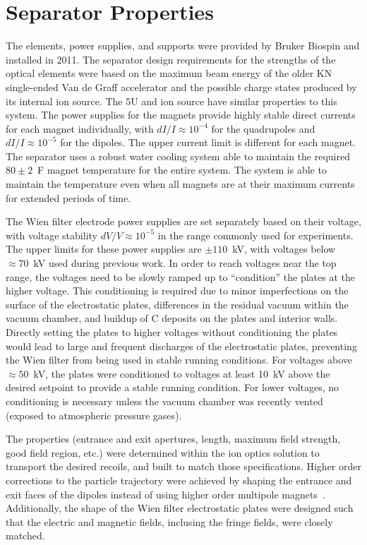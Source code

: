 \section{Separator Properties}

The elements, power supplies, and supports were provided by Bruker
Biospin and installed in 2011. The separator design requirements for the
strengths of the optical elements were based on the maximum beam energy
of the older KN single-ended Van de Graff accelerator and the possible
charge states produced by its internal ion source. The 5U and ion source
have similar properties to this system. The power supplies for the
magnets provide highly stable direct currents for each magnet
individually, with $dI/I \approx 10^{-4}$ for the quadrupoles and $dI/I
\approx 10^{-5}$ for the dipoles. The upper current limit is different
for each magnet. The separator uses a robust water cooling system able
to maintain the required $80\pm2$~\degree{}F magnet temperature for the
entire system. The system is able to maintain the temperature even when
all magnets are at their maximum currents for extended periods of time.

The Wien filter electrode power supplies are set separately based on
their voltage, with voltage stability $dV/V \approx 10^{-5}$ in the
range commonly used for experiments. The upper limits for these power
supplies are $\pm110$~kV, with voltages below $\approx 70$~kV used
during previous work. In order to reach voltages near the top range, the
voltages need to be slowly ramped up to ``condition'' the plates at the
higher voltage. This conditioning is required due to minor imperfections
on the surface of the electrostatic plates, differences in the residual
vacuum within the vacuum chamber, and buildup of C deposits on the
plates and interior walls. Directly setting the plates to higher
voltages without conditioning the plates would lead to large and
frequent discharges of the electrostatic plates, preventing the Wien
filter from being used in stable running conditions. For voltages above
$\approx 50$~kV, the plates were conditioned to voltages at least 10~kV
above the desired setpoint to provide a stable running condition. For
lower voltages, no conditioning is necessary unless the vacuum chamber
was recently vented (exposed to atmospheric pressure gases).

The properties (entrance and exit apertures, length, maximum field
strength, good field region, etc.) were determined within the ion optics
solution to transport the desired recoils, and built to match those
specifications. Higher order corrections to the particle trajectory were
achieved by shaping the entrance and exit faces of the dipoles instead
of using higher order multipole magnets~\cite{Couder2008}. Additionally,
the shape of the Wien filter electrostatic plates were designed such
that the electric and magnetic fields, inclusing the fringe fields, were
closely matched.


